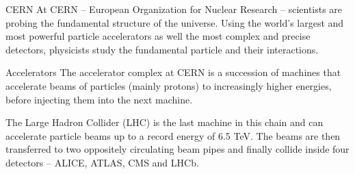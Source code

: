

\begin{frame}
	\begin{block}{CERN}
		At CERN -- European Organization for Nuclear Research -- scientists are probing the fundamental structure of the universe. Using the world's largest and most powerful particle accelerators as well the most complex and precise detectors, physicists study the fundamental particle and their interactions.
	\end{block}
	\begin{block}{Accelerators}
		The accelerator complex at CERN is a succession of machines that accelerate beams of particles (mainly protons) to increasingly higher energies, before injecting them into the next machine.
		
		The Large Hadron Collider (LHC) is the last machine in this chain and can accelerate particle beams up to a record energy of 6.5 TeV. The beams are then transferred to two oppositely circulating beam pipes and finally collide inside four detectors -- ALICE, ATLAS, CMS and LHCb.
	\end{block}
\end{frame}


